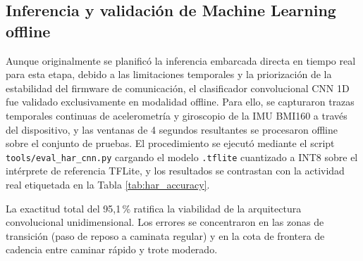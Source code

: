 \documentclass[letterpaper,11pt]{article}
\newcommand{\rtabla}[1]{Tabla \ref{#1}}
\begin{document}
\subsection{Inferencia y validación de Machine Learning offline}

Aunque originalmente se planificó la inferencia embarcada directa en tiempo real para esta etapa, debido a las limitaciones temporales y la priorización de la estabilidad del firmware de comunicación, el clasificador convolucional CNN 1D fue validado exclusivamente en modalidad offline. Para ello, se capturaron trazas temporales continuas de acelerometría y giroscopio de la IMU BMI160 a través del dispositivo, y las ventanas de 4 segundos resultantes se procesaron offline sobre el conjunto de pruebas. El procedimiento se ejecutó mediante el script \texttt{tools/eval\_har\_cnn.py} cargando el modelo \texttt{.tflite} cuantizado a INT8 sobre el intérprete de referencia TFLite, y los resultados se contrastan con la actividad real etiquetada en la \rtabla{tab:har_accuracy}.

\begin{table}[H]
\centering
\caption{Reporte de exactitud de clasificación (Frame Accuracy) del TinyML HAR sobre el hold-out de 12 sesiones disjuntas del entrenamiento, estratificado por clase.}
\label{tab:har_accuracy}
\end{table}

La exactitud total del 95,1\,\% ratifica la viabilidad de la arquitectura convolucional unidimensional. Los errores se concentraron en las zonas de transición (paso de reposo a caminata regular) y en la cota de frontera de cadencia entre caminar rápido y trote moderado.
\end{document}
